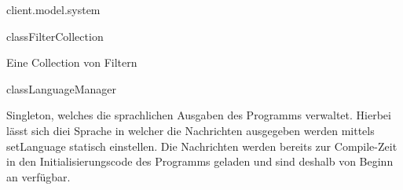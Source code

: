 \begin{texdocpackage}{client.model.system}
\begin{texdocclass}{class}{FilterCollection}
\label{texdoclet:edu.kit.informatik.studyplan.client.model.system.FilterCollection}
\begin{texdocclassintro}
Eine Collection von Filtern\end{texdocclassintro}
\begin{texdocclassfields}
\end{texdocclassfields}
\begin{texdocclassconstructors}
\end{texdocclassconstructors}
\end{texdocclass}


\begin{texdocclass}{class}{LanguageManager}
\label{texdoclet:edu.kit.informatik.studyplan.client.model.system.LanguageManager}
\begin{texdocclassintro}
Singleton, welches die sprachlichen Ausgaben des Programms verwaltet. Hierbei
 lässt sich diei Sprache in welcher die Nachrichten ausgegeben werden mittels
 setLanguage statisch einstellen. Die Nachrichten werden bereits zur
 Compile-Zeit in den Initialisierungscode des Programms geladen und sind
 deshalb von Beginn an verfügbar.\end{texdocclassintro}
\begin{texdocclassfields}
\end{texdocclassfields}
\begin{texdocclassconstructors}
\end{texdocclassconstructors}
\begin{texdocclassmethods}
\end{texdocclassmethods}
\end{texdocclass}
\end{texdocpackage}
